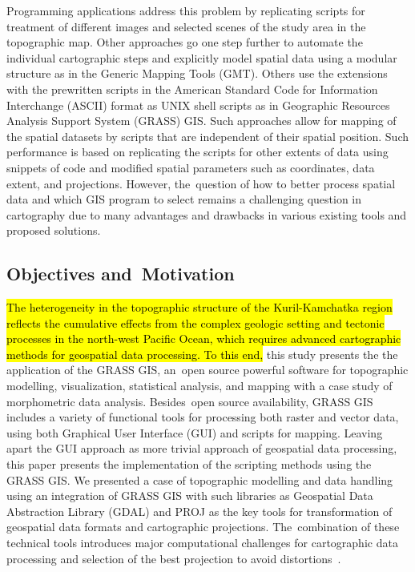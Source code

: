 \documentclass[technologies,article,accept,pdftex,moreauthors]{Definitions/mdpi}
\begin{document}
Programming applications address this problem by replicating scripts for treatment of different images and selected scenes of the study area in the topographic map. Other approaches go one step further to automate {the }individual cartographic steps and explicitly model spatial data using {a modular structure }as in {the }Generic Mapping Tools {(}GMT){. Others} use {the }extensions with {the }prewritten scripts in {the }American Standard Code for Information Interchange (ASCII) format as UNIX shell scripts as in {Geographic Resources Analysis Support System (GRASS) GIS}. Such approaches allow for mapping of {the spatial }datasets by scripts that are independent of their spatial position. {Such performance is based on} replicating the{ }scripts for other extents of data using snippets of code {and} modified spatial parameters {such as }coordinates, data extent, and projections{. }However, the~question of how to better process spatial data and which {GIS }program to select remains a challenging question in cartography due to many advantages and drawbacks in various {existing }tools {and proposed solutions}. 

\subsection{Objectives and~Motivation}
\hl{The heterogeneity in the topographic structure of the Kuril-Kamchatka region reflects the cumulative effects from the complex geologic setting and tectonic processes in the north-west Pacific Ocean, which requires advanced cartographic methods for geospatial data processing. To this end, }this study presents the {the application} of {the }GRASS{ }GIS, an~open source powerful software for topographic {modelling}, visualization, statistical{ }analysis, and mapping with a case study of{ }morphometric data analysis. Besides~open source availability, GRASS GIS includes a variety of functional tools for processing both raster and vector data, using both Graphical User Interface (GUI) and scripts for mapping. Leaving apart the GUI approach as more trivial{ }approach of geospatial data processing, this paper {presents} the {implementation} of {the }scripting methods {using the }GRASS GIS. We presented a case of topographic modelling and data handling using an integration of GRASS GIS with such libraries as Geospatial Data Abstraction Library (GDAL) and PROJ as the key tools for transformation of geospatial data formats and cartographic projections. The~combination of these technical tools introduces major computational challenges for cartographic data processing and {selection of the best} projection to avoid distortions~\cite{Kiani}.
\end{document}
